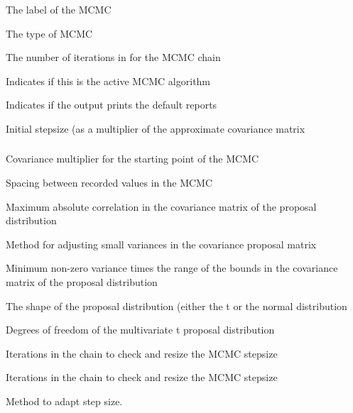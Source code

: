 
 {The label of the MCMC}

 {The type of MCMC}

 {The number of iterations in for the MCMC chain}

 {Indicates if this is the active MCMC algorithm}

 {Indicates if the output prints the default reports}

 {Initial stepsize (as a multiplier of the approximate covariance matrix}

\subsubsection[Independence Metropolis]{}

 {Covariance multiplier for the starting point of the MCMC}

 {Spacing between recorded values in the MCMC}

 {Maximum absolute correlation in the covariance matrix of the proposal distribution}

 {Method for adjusting small variances in the covariance proposal matrix}

 {Minimum non-zero variance times the range of the bounds in the covariance matrix of the proposal distribution}

 {The shape of the proposal distribution (either the t or the normal distribution}

 {Degrees of freedom of the multivariate t proposal distribution}

 {Iterations in the chain to check and resize the MCMC stepsize}

 {Iterations in the chain to check and resize the MCMC stepsize}

 {Method to adapt step size.}

